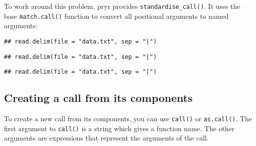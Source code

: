 To work around this problem, pryr provides \texttt{standardise\_call()}.
It uses the base \texttt{match.call()} function to convert all
positional arguments to named arguments: 

\begin{Shaded}
\begin{Highlighting}[]
\end{Highlighting}
\end{Shaded}

\begin{verbatim}
## read.delim(file = "data.txt", sep = "|")
\end{verbatim}

\begin{Shaded}
\begin{Highlighting}[]
\end{Highlighting}
\end{Shaded}

\begin{verbatim}
## read.delim(file = "data.txt", sep = "|")
\end{verbatim}

\begin{Shaded}
\begin{Highlighting}[]
\end{Highlighting}
\end{Shaded}

\begin{verbatim}
## read.delim(file = "data.txt", sep = "|")
\end{verbatim}

\hypertarget{creating-a-call-from-its-components}{%
\subsection{Creating a call from its
components}\label{creating-a-call-from-its-components}}

To create a new call from its components, you can use \texttt{call()} or
\texttt{as.call()}. The first argument to \texttt{call()} is a string
which gives a function name. The other arguments are expressions that
represent the arguments of the call.  

\begin{Shaded}
\begin{Highlighting}[]
\NormalTok{(}\NormalTok{, }\NormalTok{, }\NormalTok{)}
\end{Highlighting}
\end{Shaded}

